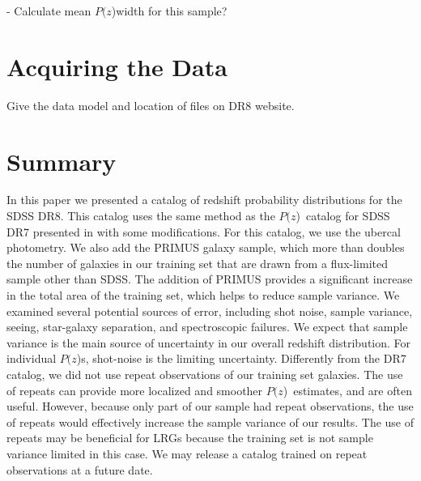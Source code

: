 \documentclass[preprint]{aastex}
\newcommand{\pofz}{$P(z$)}
\begin{document}
 - Calculate mean \pofz width for this sample?


\section{Acquiring the Data}

{\color{red} Give the data model and location  of files on DR8 website. }

\section{Summary}

In this paper we presented a catalog of redshift probability distributions for
the SDSS DR8.  This catalog uses the same method as the \pofz\ catalog for SDSS
DR7 presented in \cite{CunhaPhotoz09} with some modifications.  For this
catalog, we use the ubercal photometry.  We also add the PRIMUS galaxy sample,
which more than doubles the number of galaxies in our training set that are
drawn from a flux-limited sample other than SDSS.  The addition of PRIMUS
provides a significant increase in the total area of the training set, which
helps to reduce sample variance.  We examined several potential sources of
error, including shot noise, sample variance, seeing, star-galaxy separation,
and spectroscopic failures.  We expect that sample variance is the main source
of uncertainty in our overall redshift distribution.  For individual \pofz s,
shot-noise is the limiting uncertainty.  Differently from the DR7 catalog, we
did not use repeat observations of our training set galaxies.  The use of
repeats can provide more localized and smoother \pofz\ estimates, and are often
useful.  However, because only part of our sample had repeat observations, the
use of repeats would effectively increase the sample variance of our results.
The use of repeats may be beneficial for LRGs because the training set is not
sample variance limited in this case.  We may release a catalog trained on
repeat observations at a future date.  
\end{document}
